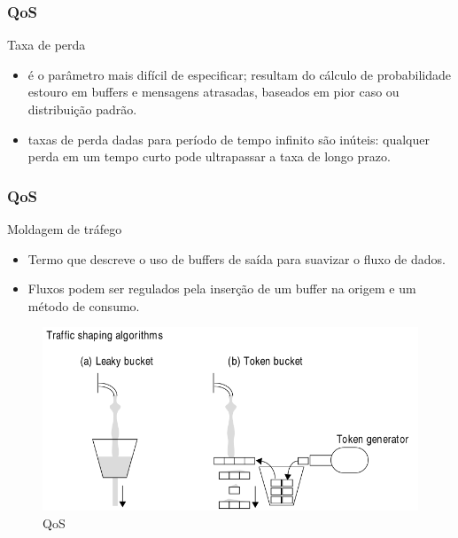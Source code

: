 \documentclass[]{beamer}
\begin{document}
\begin{frame}
  \frametitle{QoS}
Taxa de perda
\begin{itemize}
  \item é o parâmetro mais difícil de especificar; resultam do cálculo de probabilidade 
estouro em buffers e mensagens atrasadas, baseados em pior caso ou distribuição padrão.
  \item taxas de perda dadas para período de tempo infinito são inúteis: qualquer perda
em um tempo curto pode ultrapassar a taxa de longo prazo.
\end{itemize}
\end{frame}

\begin{frame}
  \frametitle{QoS}
Moldagem de tráfego
\begin{itemize}
  \item Termo que descreve o uso de buffers de saída para suavizar o fluxo de dados.
  \item Fluxos podem ser regulados pela inserção de um buffer na origem e um método de 
consumo.
\end{itemize}
\end{frame}

\begin{frame}
  \begin{figure}[hbtp]
   \caption{QoS}
   \begin{center}
    \includegraphics[scale=0.33]{balde_furado.png}
   \end{center}
  \end{figure}
\end{frame}
\end{document}
